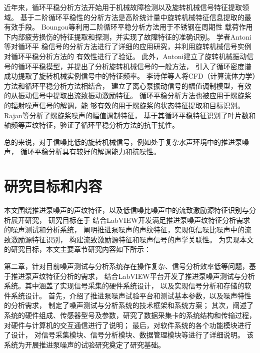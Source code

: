 近年来，循环平稳分析方法开始用于机械故障检测以及旋转机械信号特征提取领域\cite{何俊2007,antoniCyclicSpectralAnalysis2007a,2017Extrapolation}。
基于二阶循环平稳性的分析方法是高阶统计量中旋转机械特征信息提取的最有效手段\cite{antoniUseCyclicPower2005}。
Boungou等\cite{boungouFatigueDamageDetection2015}利用二阶循环平稳分析方法用于不锈钢在周期性
载荷作用下内部疲劳损伤的特征提取和探测，并实现了故障特征的准确识别。
学者Antoni等\cite{antoniCyclostationarityExamples2009}对循环平
稳信号的分析方法进行了详细的应用研究，并利用旋转机械信号实例对循环平稳分析方法的
有效性进行了验证。
此外，Antoni建立了旋转机械振动信号的循环平稳摸型，并提出了分析旋转机械信号的一般方法，
引入了循环密度谱成功提取了旋转机械实例信号中的特征频率\cite{antoniCyclostationaryModellingRotating2004a}。
李诗佯等\cite{2019Cyclostationary}人将CFD（计算流体力学）方法和循环平稳分析方法相结合，
建立了离心泵振动信号的幅值调制模型，有效的从振动信号中提取出流致振动激励特征。
循环平稳分析方法也被应用于螺旋桨的辐射噪声信号的解调，能
够有效的用于螺旋桨的状态特征提取和目标识别\cite{antoniDetectionSurfaceShips2012}。
Rajan等\cite{rajanCyclostationarityBasedSonar2016}分析了螺旋桨噪声的幅值调制特征，
基于其循环平稳特征识别了叶片数和轴频等声纹特征，验证了循环平稳分析方法的抗干扰性。

总的来说，对于信噪比低的旋转机械信号，例如处于复杂水声环境中的推进泵噪声，
循环平稳分析具有较好的解调能力和抗噪性。

\section{研究目标和内容}
本文围绕推进泵噪声的声纹特征，以及低信噪比噪声中的流致激励源特征识别与分析展开研究，
研究目标在于
结合LabVIEW开发满足推进泵噪声纹特征分析需求的噪声测试和分析系统，
阐明推进泵噪声的声纹特征，实现低信噪比噪声中的流致激励源特征识别，
构建流致激励源特征和噪声信号的声学关联性。
为实现本文的研究目标，本文主要章节研究内容如下所示：

第二章，针对目前噪声测试与分析系统存在操作复杂、信号分析效率低等问题，基于推进泵声纹特征分析的需求，
结合LabVIEW平台开发了推进泵噪声测试与分析系统。其中涵盖了实现信号采集的硬件系统设计，
以及实现信号分析和存储的软件系统设计。
首先，介绍了推进泵噪声试验平台和测试基本参数，以及噪声特性的分析需求，
制定了噪声测试与分析系统的技术框架和系统方案；
其次，阐述了系统的硬件组成、传感器型号及参数，研究了数据采集卡的系统结构和传输过程，
对硬件与计算机的交互通信进行了说明；
最后，对软件系统的各个功能模块进行了设计，
对信号采集模块、信号分析模块、数据管理模块等进行了详细说明。
该系统为开展推进泵噪声的试验研究奠定了研究基础。


